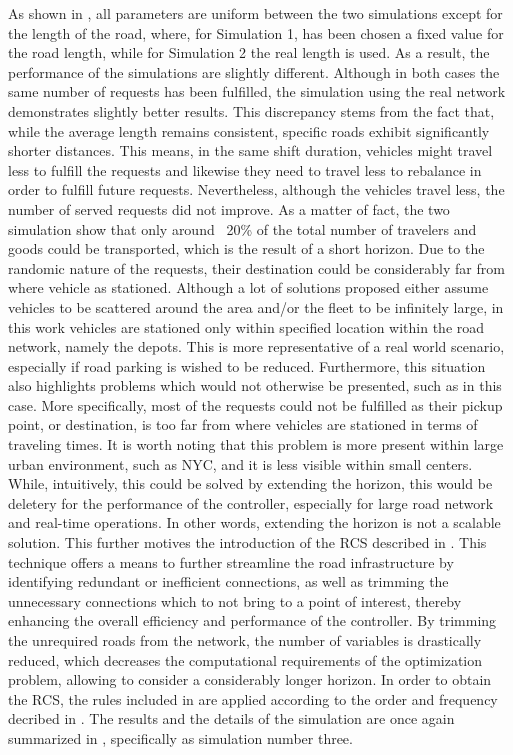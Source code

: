As shown in , all parameters are uniform between the two simulations except for the length of the road, where, for Simulation 1, has been chosen a fixed value for the road length, while for Simulation 2 the real length is used. As a result, the performance of the simulations are slightly different. Although in both cases the same number of requests has been fulfilled, the simulation using the real network demonstrates slightly better results. This discrepancy stems from the fact that, while the average length remains consistent, specific roads exhibit significantly shorter distances. This means, in the same shift duration, vehicles might travel less to fulfill the requests and likewise they need to travel less to rebalance in order to fulfill future requests. Nevertheless, although the vehicles travel less, the number of served requests did not improve. As a matter of fact, the two simulation show that only around ~20\% of the total number of travelers and goods could be transported, which is the result of a short horizon. Due to the randomic nature of the requests, their destination could be considerably far from where vehicle as stationed. Although a lot of solutions proposed either assume vehicles to be scattered around the area and/or the fleet to be infinitely large, in this work vehicles are stationed only within specified location within the road network, namely the depots. This is more representative of a real world scenario, especially if road parking is wished to be reduced. Furthermore, this situation also highlights problems which would not otherwise be presented, such as in this case. More specifically, most of the requests could not be fulfilled as their pickup point, or destination, is too far from where vehicles are stationed in terms of traveling times. It is worth noting that this problem is more present within large urban environment, such as NYC, and it is less visible within small centers. While, intuitively, this could be solved by extending the horizon, this would be deletery for the performance of the controller, especially for large road network and real-time operations. In other words, extending the horizon is not a scalable solution. This further motives the introduction of the RCS described in . This technique offers a means to further streamline the road infrastructure by identifying redundant or inefficient connections, as well as trimming the unnecessary connections which to not bring to a point of interest, thereby enhancing the overall efficiency and performance of the controller. By trimming the unrequired roads from the network, the number of variables is drastically reduced, which decreases the computational requirements of the optimization problem, allowing to consider a considerably longer horizon. In order to obtain the RCS, the rules included in  are applied according to the order and frequency decribed in . The results and the details of the simulation are once again summarized in , specifically as simulation number three.
